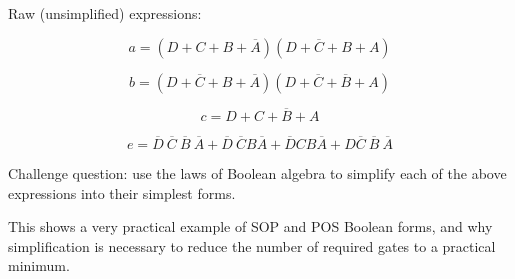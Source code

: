 





Raw (unsimplified) expressions:

$$a = (D + C + B + \overline{A})(D + \overline{C} + B + A)$$

$$b = (D + \overline{C} + B + \overline{A})(D + \overline{C} + \overline{B} + A)$$

$$c = D + C + \overline{B} + A$$

$$e = \overline{D} \> \overline{C} \> \overline{B} \> \overline{A} + \overline{D} \> \overline{C} B \overline{A} + \overline{D} C B \overline{A} + D \overline{C} \> \overline{B} \> \overline{A}$$

\vskip 10pt

Challenge question: use the laws of Boolean algebra to simplify each of the above expressions into their simplest forms.







This shows a very practical example of SOP and POS Boolean forms, and why simplification is necessary to reduce the number of required gates to a practical minimum.




